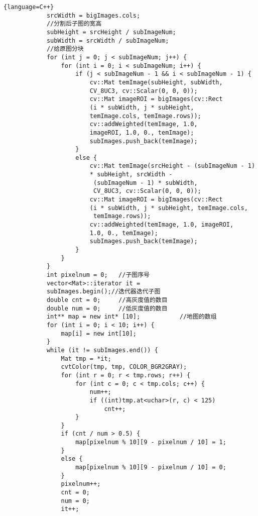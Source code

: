 \documentclass[withoutpreface,bwprint]{cumcmthesis} %
\begin{document}
\begin{appendix}
\begin{lstlisting}{language=C++}
            srcWidth = bigImages.cols;
            //分割后子图的宽高
            subHeight = srcHeight / subImageNum;
            subWidth = srcWidth / subImageNum;
            //给原图分块
            for (int j = 0; j < subImageNum; j++) {
                for (int i = 0; i < subImageNum; i++) {
                    if (j < subImageNum - 1 && i < subImageNum - 1) {
                        cv::Mat temImage(subHeight, subWidth, 
                        CV_8UC3, cv::Scalar(0, 0, 0));
                        cv::Mat imageROI = bigImages(cv::Rect
                        (i * subWidth, j * subHeight, 
                        temImage.cols, temImage.rows));
                        cv::addWeighted(temImage, 1.0, 
                        imageROI, 1.0, 0., temImage);
                        subImages.push_back(temImage);
                    }
                    else {
                        cv::Mat temImage(srcHeight - (subImageNum - 1) 
                        * subHeight, srcWidth - 
                         (subImageNum - 1) * subWidth, 
                         CV_8UC3, cv::Scalar(0, 0, 0));
                        cv::Mat imageROI = bigImages(cv::Rect
                        (i * subWidth, j * subHeight, temImage.cols,
                         temImage.rows));
                        cv::addWeighted(temImage, 1.0, imageROI, 
                        1.0, 0., temImage);
                        subImages.push_back(temImage);
                    }
                }
            }
            int pixelnum = 0;   //子图序号
            vector<Mat>::iterator it = 
            subImages.begin();//迭代器迭代子图
            double cnt = 0;     //高灰度值的数目
            double num = 0;     //低灰度值的数目
            int** map = new int* [10];           //地图的数组
            for (int i = 0; i < 10; i++) {
                map[i] = new int[10];
            }
            while (it != subImages.end()) {
                Mat tmp = *it;
                cvtColor(tmp, tmp, COLOR_BGR2GRAY);
                for (int r = 0; r < tmp.rows; r++) {
                    for (int c = 0; c < tmp.cols; c++) {
                        num++;
                        if ((int)tmp.at<uchar>(r, c) < 125)
                            cnt++;
                    }
                }
                if (cnt / num > 0.5) {
                    map[pixelnum % 10][9 - pixelnum / 10] = 1;
                }
                else {
                    map[pixelnum % 10][9 - pixelnum / 10] = 0;
                }
                pixelnum++;
                cnt = 0;
                num = 0;
                it++;

\end{lstlisting}
\end{appendix}
\end{document}
